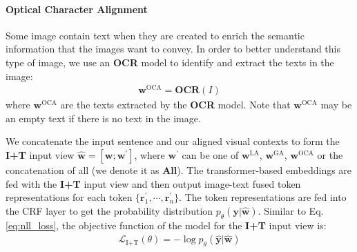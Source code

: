 \documentclass[11pt]{article}
\newcommand{\mcL}{\mathcal{L}}
\def\vr{{\bm{r}}}
\def\vw{{\bm{w}}}
\def\vy{{\bm{y}}}
\begin{document}
\paragraph{Optical Character Alignment} Some image contain text when they are created to enrich the semantic information that the images want to convey. In order to better understand this type of image, we use an \textbf{OCR} model to identify and extract the texts in the image:
\begin{align}
\vw^{\text{OCA}} = \textbf{OCR}(I) \nonumber
\end{align}
where $\vw^{\text{OCA}}$ are the texts extracted by the \textbf{OCR} model. Note that $\vw^{\text{OCA}}$ may be an empty text if there is no text in the image.

We concatenate the input sentence and our aligned visual contexts to form the \textbf{I+T} input view $\hat{\vw}=[\vw;\vw^\prime]$, where $\vw^\prime$ can be one of $\vw^{\text{LA}}$, $\vw^{\text{GA}}$, $\vw^{\text{OCA}}$ or the concatenation of all (we denote it as \textbf{All}). The transformer-based embeddings are fed with the \textbf{I+T} input view and then output image-text fused token representations for each token $\{\vr_1^\prime, \cdots, \vr_n^\prime\}$. The token representations are fed into the CRF layer to get the probability distribution $p_\theta(\vy|\hat{\vw})$. Similar to Eq. \ref{eq:nll_loss}, the objective function of the model for the \textbf{I+T} input view is:
\begin{align}
\mcL_{\text{I+T}}(\theta) = - \log p_\theta(\hat{\vy}|\hat{\vw}) \label{eq:nll_x}
\end{align}
\end{document}
